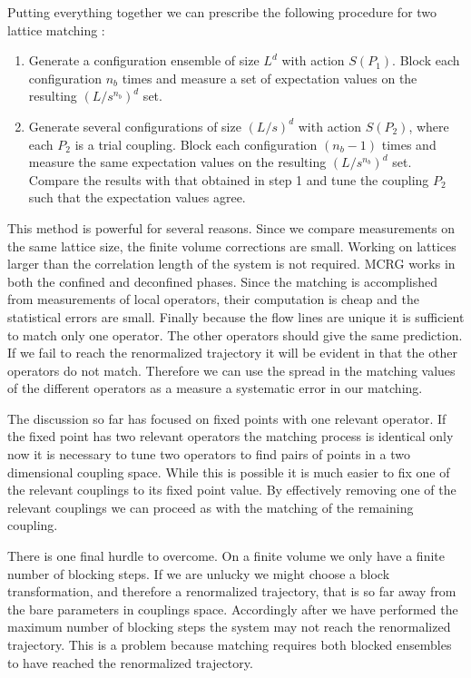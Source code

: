 Putting everything together we can prescribe the following procedure for two lattice matching \cite{Hasenfratz:2009}:
\begin{enumerate}
  \item Generate a configuration ensemble of size $L^d$ with action $S(P_1)$. Block each configuration $n_b$ times and measure a set of expectation values on the resulting $(L/s^{n_b})^d$ set.
  \item Generate several configurations of size $(L/s)^d$ with action $S(P_2)$, where each $P_2$ is a trial coupling. Block each configuration $(n_b-1)$ times and measure the same expectation values on the resulting $(L/s^{n_b})^d$ set. Compare the results with that obtained in step 1 and tune the coupling $P_2$ such that the expectation values agree. 
\end{enumerate}

This method is powerful for several reasons.
Since we compare measurements on the same lattice size, the finite volume corrections are small.
Working on lattices larger than the correlation length of the system is not required.
MCRG works in both the confined and deconfined phases.
Since the matching is accomplished from measurements of local operators, their computation is cheap and the statistical errors are small.
Finally because the flow lines are unique it is sufficient to match only one operator.
The other operators should give the same prediction.
If we fail to reach the renormalized trajectory it will be evident in that the other operators do not match.
Therefore we can use the spread in the matching values of the different operators as a measure a systematic error in our matching.

The discussion so far has focused on fixed points with one relevant operator.
If the fixed point has two relevant operators the matching process is identical only now it is necessary to tune two operators to find pairs of points in a two dimensional coupling space.
While this is possible it is much easier to fix one of the relevant couplings to its fixed point value.
By effectively removing one of the relevant couplings we can proceed as with the matching of the remaining coupling.

There is one final hurdle to overcome.
On a finite volume we only have a finite number of blocking steps.
If we are unlucky we might choose a block transformation, and therefore a renormalized trajectory, that is so far away from the bare parameters in couplings space.
Accordingly after we have performed the maximum number of blocking steps the system may not reach the renormalized trajectory.
This is a problem because matching requires both blocked ensembles to have reached the renormalized trajectory.

